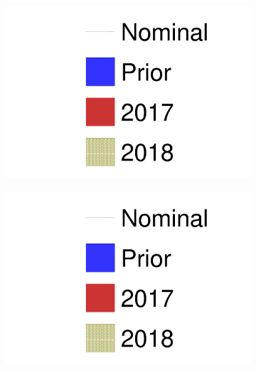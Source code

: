 \begin{figure}[h]
	\begin{subfigure}[t]{0.32\textwidth}
		\includegraphics[width=\textwidth, trim={0mm 0mm 0mm 0mm}, clip, page=2]{figures/mach3/2018/data/prior_error_1june_try_2017_fit_on_sk_spectra_2018_results_test_spectra}
	\end{subfigure}
	\begin{subfigure}[t]{0.32\textwidth}
		\includegraphics[width=\textwidth, trim={0mm 0mm 0mm 0mm}, clip, page=3]{figures/mach3/2018/data/prior_error_1june_try_2017_fit_on_sk_spectra_2018_results_test_spectra}
	\end{subfigure}
	\begin{subfigure}[t]{0.32\textwidth}

\end{subfigure}
\end{figure}
